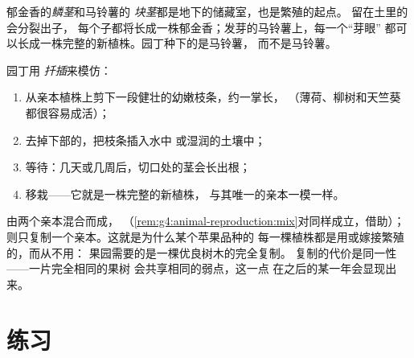 \begin{example}[鳞茎和块茎]\label{ex:g4:plants-without-seeds:bulbtuber}
郁金香的\emph{鳞茎}和马铃薯的
\emph{块茎}都是地下的储藏室，也是繁殖的起点。
留在土里的会分裂出子，
每个子都将长成一株郁金香；发芽的马铃薯上，每一个“芽眼”
都可以长成一株完整的新植株。园丁种下的是马铃薯，
而不是马铃薯。
\end{example}

\begin{method}[扦插]\label{met:g4:plants-without-seeds:cutting}
园丁用
\emph{扦插}来模仿：
\begin{enumerate}
  \item 从亲本植株上剪下一段健壮的幼嫩枝条，约一掌长，
        （薄荷、柳树和天竺葵都很容易成活）；
  \item 去掉下部的，把枝条插入水中
        或湿润的土壤中；
  \item 等待：几天或几周后，切口处的茎会长出根；
  \item 移栽——它就是一株完整的新植株，
        与其唯一的亲本一模一样。
\end{enumerate}
\end{method}

\begin{remark}\label{rem:g4:plants-without-seeds:copy}
由两个亲本混合而成，
（\cref{rem:g4:animal-reproduction:mix}对同样成立，借助）；
则只复制一个亲本。这就是为什么某个苹果品种的
每一棵植株都是用或嫁接繁殖的，而从不用：
果园需要的是一棵优良树木的完全复制。
复制的代价是同一性——一片完全相同的果树
会共享相同的弱点，这一点
在之后的某一年会显现出来。
\end{remark}

\section{练习}

